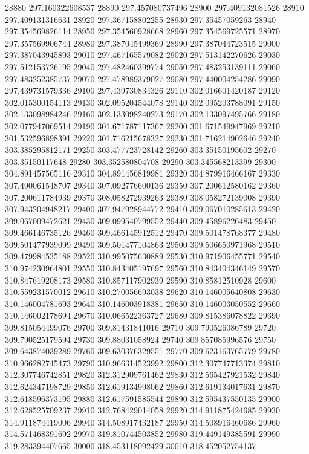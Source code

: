 {28880 297.160322608537
28890 297.457080737496
28900 297.409132081526
28910 297.409131316631
28920 297.367158802255
28930 297.35457059263
28940 297.354569826114
28950 297.354560928668
28960 297.354569725571
28970 297.357569906744
28980 297.387045499369
28990 297.387044723515
29000 297.387043945893
29010 297.467165579082
29020 297.513142270626
29030 297.512153726195
29040 297.482460399774
29050 297.483253139111
29060 297.483252385737
29070 297.478989379027
29080 297.440004254286
29090 297.439731579336
29100 297.439730834326
29110 302.016601420187
29120 302.015300154113
29130 302.095204544078
29140 302.095203788091
29150 302.133098984246
29160 302.133098240273
29170 302.133097495766
29180 302.077947069514
29190 301.671787117367
29200 301.671549947969
29210 301.532596898391
29220 301.716215678327
29230 301.716214902646
29240 303.385295812171
29250 303.477723728142
29260 303.35150195602
29270 303.35150117648
29280 303.352580804708
29290 303.345568213399
29300 304.891457565116
29310 304.891456819981
29320 304.879916466167
29330 307.490061548707
29340 307.092776600136
29350 307.200612580162
29360 307.200611784939
29370 308.058272939263
29380 308.058272139008
29390 307.943204948217
29400 307.947928944772
29410 309.067010285613
29420 309.067009472621
29430 309.099540799552
29440 309.45896226483
29450 309.466146735126
29460 309.466145912512
29470 309.501478768377
29480 309.501477939099
29490 309.501477104863
29500 309.506650971968
29510 309.479984535188
29520 310.995075630889
29530 310.971906455771
29540 310.974230964801
29550 310.843405197697
29560 310.843404346149
29570 310.847619208173
29580 310.857117902939
29590 310.85812510928
29600 310.559231570012
29610 310.270056693038
29620 310.146005640808
29630 310.146004781693
29640 310.146003918381
29650 310.146003050552
29660 310.146002178694
29670 310.066522363727
29680 309.815386078822
29690 309.815054499076
29700 309.81431841016
29710 309.790526086789
29720 309.790525179594
29730 309.88031058924
29740 309.857085996576
29750 309.643874039289
29760 309.630376329551
29770 309.623163765779
29780 310.966282745473
29790 310.966314523992
29800 312.307747713374
29810 312.307746742851
29820 312.312909761462
29830 312.565427921532
29840 312.624347198729
29850 312.619134998062
29860 312.619134017631
29870 312.618596373195
29880 312.617591585544
29890 312.595437550135
29900 312.628525709237
29910 312.768429014058
29920 314.911875424685
29930 314.911874419006
29940 314.508917432187
29950 314.508916460686
29960 314.571468391692
29970 319.810744503852
29980 319.449149385591
29990 319.283394407665
30000 318.453118092429
30010 318.452052754137
}
